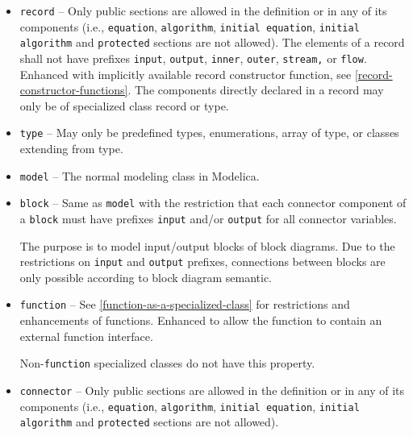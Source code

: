 \begin{itemize}
\item \lstinline!record! --
Only public sections are allowed in the definition or in any of its components (i.e., \lstinline!equation!, \lstinline!algorithm!, \lstinline!initial equation!, \lstinline!initial algorithm! and \lstinline!protected! sections are not allowed).  The elements of a record shall not have prefixes \lstinline!input!, \lstinline!output!, \lstinline!inner!, \lstinline!outer!, \lstinline!stream,! or \lstinline!flow!.  Enhanced with implicitly available record constructor function, see \cref{record-constructor-functions}.  The components directly declared in a record may only be of specialized class record or type.

\item \lstinline!type! --
May only be predefined types, enumerations, array of type, or classes extending from type.

\item \lstinline!model! --
The normal modeling class in Modelica.

\item \lstinline!block! --
Same as \lstinline!model! with the restriction that each connector component of a \lstinline!block! must have prefixes \lstinline!input! and/or \lstinline!output! for all connector variables.

\begin{nonnormative}
The purpose is to model input/output blocks of block diagrams.  Due to the restrictions on \lstinline!input! and \lstinline!output! prefixes,
connections between blocks are only possible according to block diagram semantic.
\end{nonnormative}

\item \lstinline!function! --
See \cref{function-as-a-specialized-class} for restrictions and enhancements of functions. Enhanced to allow the function to contain an external function interface.

\begin{nonnormative}
Non-\lstinline!function! specialized classes do not have this property.
\end{nonnormative}

\item \lstinline!connector! --
Only public sections are allowed in the definition or in any of its components (i.e., \lstinline!equation!, \lstinline!algorithm!, \lstinline!initial equation!, \lstinline!initial algorithm! and \lstinline!protected! sections are not allowed).


\end{itemize}
